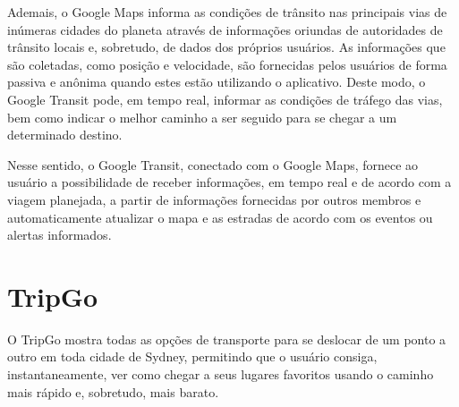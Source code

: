 Ademais, o Google Maps informa as condições de trânsito nas principais vias de inúmeras cidades do planeta através de informações oriundas de autoridades de trânsito locais e, sobretudo, de dados dos próprios usuários. As informações que são coletadas, como posição e velocidade, são fornecidas pelos usuários de forma passiva e anônima quando estes estão utilizando o aplicativo. Deste modo, o Google Transit pode, em tempo real, informar as condições de tráfego das vias, bem como indicar o melhor caminho a ser seguido para se chegar a um determinado destino.

Nesse sentido, o Google Transit, conectado com o Google Maps, fornece ao usuário a possibilidade de receber informações, em tempo real e de acordo com a viagem planejada, a partir de informações fornecidas por outros membros e automaticamente atualizar o mapa e as estradas de acordo com os eventos ou alertas informados. 

\section{TripGo}

O TripGo mostra todas as opções de transporte para se deslocar de um ponto a outro em toda cidade de Sydney, permitindo que o usuário consiga, instantaneamente, ver como chegar a seus lugares favoritos usando o caminho mais rápido e, sobretudo, mais barato.

